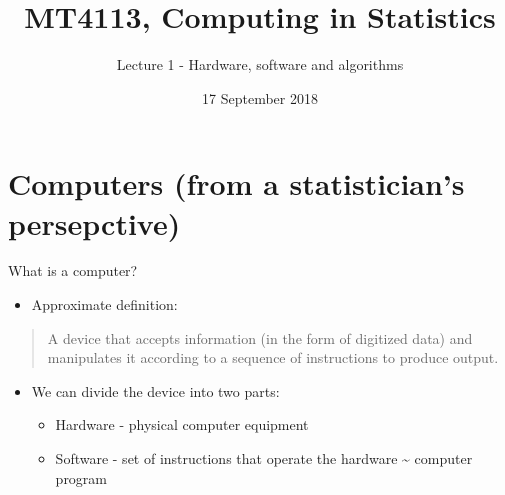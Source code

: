 \documentclass[ignorenonframetext,]{beamer}
\title{MT4113, Computing in Statistics}
\author{Lecture 1 - Hardware, software and algorithms}
\date{17 September 2018}
\providecommand{\tightlist}{%
  \setlength{\itemsep}{0pt}\setlength{\parskip}{0pt}}
\begin{document}
\frame{\titlepage}

\begin{frame}
\tableofcontents[hideallsubsections]
\end{frame}

\begin{frame}

\end{frame}

\section{Computers (from a statistician's
persepctive)}\label{computers-from-a-statisticians-persepctive}

\begin{frame}{What is a computer?}

\begin{itemize}[<+->]
\tightlist
\item
  Approximate definition:
\end{itemize}

\begin{quote}
A device that accepts information (in the form of digitized data) and
manipulates it according to a sequence of instructions to produce
output.
\end{quote}

\begin{itemize}[<+->]
\tightlist
\item
  We can divide the device into two parts:

  \begin{itemize}[<+->]
  \tightlist
  \item
    Hardware - physical computer equipment
  \item
    Software - set of instructions that operate the hardware
    \textasciitilde{} computer program
  \end{itemize}
\end{itemize}

\end{frame}
\end{document}
